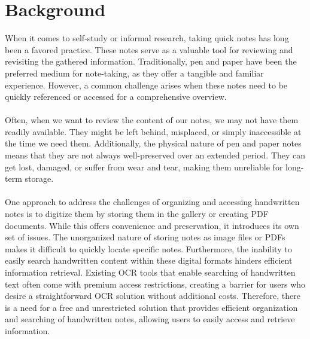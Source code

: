 \section{Background}\label{sec:bkgrnd}%
When it comes to self-study or informal research, taking quick notes has long been a
favored practice. These notes serve as a valuable tool for reviewing and revisiting the
gathered information. Traditionally, pen and paper have been the preferred medium for
note-taking, as they offer a tangible and familiar experience. However, a common
challenge arises when these notes need to be quickly referenced or accessed for a
comprehensive overview.\\\\
Often, when we want to review the content of our notes, we may not have them readily
available. They might be left behind, misplaced, or simply inaccessible at the time we
need them. Additionally, the physical nature of pen and paper notes means that they are
not always well-preserved over an extended period. They can get lost, damaged, or suffer
from wear and tear, making them unreliable for long-term storage.\\\\
One approach to address the challenges of organizing and accessing handwritten notes is
to digitize them by storing them in the gallery or creating PDF documents. While this
offers convenience and preservation, it introduces its own set of issues. The unorganized
nature of storing notes as image files or PDFs makes it difficult to quickly locate specific
notes. Furthermore, the inability to easily search handwritten content within these digital
formats hinders efficient information retrieval. Existing OCR tools that enable searching
of handwritten text often come with premium access restrictions, creating a barrier for
users who desire a straightforward OCR solution without additional costs. Therefore,
there is a need for a free and unrestricted solution that provides efficient organization and
searching of handwritten notes, allowing users to easily access and retrieve information.
  

